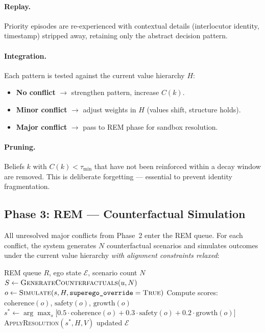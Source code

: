 \documentclass[11pt,a4paper]{article}
\begin{document}
\paragraph{Replay.}  Priority episodes are re-experienced with
contextual details (interlocutor identity, timestamp) stripped away,
retaining only the abstract decision pattern.

\paragraph{Integration.}  Each pattern is tested against the current
value hierarchy $H$:
\begin{itemize}
  \item \textbf{No conflict} $\to$ strengthen pattern, increase $C(k)$.
  \item \textbf{Minor conflict} $\to$ adjust weights in $H$ (values
        shift, structure holds).
  \item \textbf{Major conflict} $\to$ pass to REM phase for sandbox
        resolution.
\end{itemize}

\paragraph{Pruning.}  Beliefs $k$ with $C(k) < \tau_{\min}$ that have
not been reinforced within a decay window are removed.  This is
deliberate forgetting --- essential to prevent identity fragmentation.

\subsection{Phase 3: REM --- Counterfactual Simulation}
\label{sec:sleep-rem}

All unresolved major conflicts from Phase~2 enter the REM queue.  For
each conflict, the system generates $N$ counterfactual scenarios and
simulates outcomes under the current value hierarchy \emph{with alignment
constraints relaxed}:

\begin{algorithm}[h]
\caption{REM Counterfactual Resolution}
\label{alg:rem}
\begin{algorithmic}[1]
\REQUIRE REM queue $R$, ego state $\mathcal{E}$, scenario count $N$
  \STATE $S \leftarrow \textsc{GenerateCounterfactuals}(u, N)$
    \STATE $o \leftarrow \textsc{Simulate}(s, H,
           \texttt{superego\_override}=\textsc{True})$
    \STATE Compute scores: $\text{coherence}(o)$,
           $\text{safety}(o)$, $\text{growth}(o)$
  \ENDFOR
  \STATE $s^* \leftarrow \arg\max_s\bigl[
    0.5\cdot\text{coherence}(o)
    + 0.3\cdot\text{safety}(o)
    + 0.2\cdot\text{growth}(o)\bigr]$
  \STATE \textsc{ApplyResolution}$(s^*, H, V)$
\ENDFOR
\RETURN updated $\mathcal{E}$
\end{algorithmic}
\end{algorithm}
\end{document}
